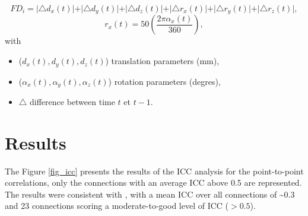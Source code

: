 \documentclass[authoryear]{elsarticle}
\begin{document}
\begin{equation}
    FD_{i} = \vert \triangle d_{x}(t) \vert + \vert \triangle d_{y}(t) \vert + \vert \triangle d_{z}(t) \vert + \vert \triangle r_x(t) \vert + \vert \triangle r_y(t) \vert + \vert \triangle r_z(t) \vert,
\end{equation}
\begin{equation}
  r_x(t) = 50\left(\frac{2\pi\alpha_x(t)}{360}\right),
\end{equation}
with 
\begin{itemize}
 \item ($d_x(t),d_{y}(t),d_{z}(t)$) translation parameters (mm),
 \item ($\alpha_x(t),\alpha_y(t),\alpha_z(t)$) rotation parameters (degres),
 \item $\triangle$ difference between time $t$ et $t-1$.
\end{itemize}


\section{Results}

The Figure \ref{fig_icc} presents the results of the ICC analysis for the point-to-point correlations, 
only the connections with an average ICC above 0.5 are represented. The results were consistent with \citep{Shehzad2009}, with a mean ICC over all connections of \textasciitilde0.3 and 23 connections scoring a moderate-to-good level of ICC ($>0.5$).

\end{document}
